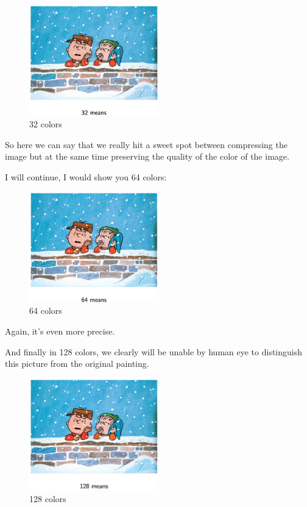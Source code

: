 \documentclass[a4paper, 12pt]{article}
\begin{document}
\begin{figure}[H]
\centering
\includegraphics[width=0.5\textwidth]{./pic/cartoon-05.png}
\caption{\label{fig:org68ee0af}32 colors}
\end{figure}

So here we can say that we really hit a sweet spot between compressing the image
but at the same time preserving the quality of the color of the image.

I will continue, I would show you 64 colors:
\begin{figure}[H]
\centering
\includegraphics[width=0.5\textwidth]{./pic/cartoon-06.png}
\caption{\label{fig:orge025ef3}64 colors}
\end{figure}

Again, it's even more precise.

And finally in 128 colors, we clearly will be unable by human eye to distinguish
this picture from the original painting.

\begin{figure}[H]
\centering
\includegraphics[width=0.5\textwidth]{./pic/cartoon-07.png}
\caption{\label{fig:orgb1e08ad}128 colors}
\end{figure}
\end{document}
